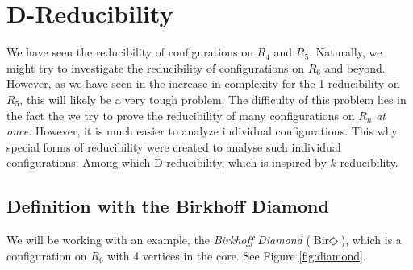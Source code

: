 \clearpage
\section{D-Reducibility}
\label{sec:dreduce}

We have seen the reducibility of configurations on $R_4$ and $R_5$. Naturally, we might try to investigate the reducibility of configurations on $R_6$ and beyond. However, as we have seen in the increase in complexity for the 1-reducibility on $R_5$, this will likely be a very tough problem. The difficulty of this problem lies in the fact the we try to prove the reducibility of many configurations on $R_n$ \textit{at once}. However, it is much easier to analyze individual configurations. This why special forms of reducibility were created to analyse such individual configurations. Among which D-reducibility, which is inspired by $k$-reducibility.

\subsection{Definition with the Birkhoff Diamond}

We will be working with an example, the \textit{Birkhoff Diamond}  ($\text{Bir}\Diamond$), which is a configuration on $R_6$ with 4 vertices in the core. See Figure \ref{fig:diamond}.

